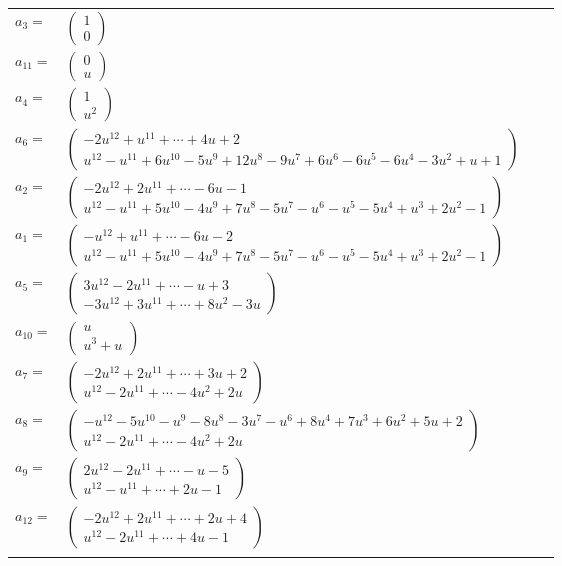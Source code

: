 \documentclass[1p]{elsarticle_modified}
\theoremstyle{definition}
\begin{document}
\begin{tabular}{m{7pt} m{180pt} m{7pt} m{180pt} }
\flushright $a_{3}=$&$\begin{pmatrix}1\\0\end{pmatrix}$ \\
\flushright $a_{11}=$&$\begin{pmatrix}0\\u\end{pmatrix}$ \\
\flushright $a_{4}=$&$\begin{pmatrix}1\\u^2\end{pmatrix}$ \\
\flushright $a_{6}=$&$\begin{pmatrix}-2 u^{12}+u^{11}+\cdots+4 u+2\\u^{12}- u^{11}+6 u^{10}-5 u^9+12 u^8-9 u^7+6 u^6-6 u^5-6 u^4-3 u^2+u+1\end{pmatrix}$ \\
\flushright $a_{2}=$&$\begin{pmatrix}-2 u^{12}+2 u^{11}+\cdots-6 u-1\\u^{12}- u^{11}+5 u^{10}-4 u^9+7 u^8-5 u^7- u^6- u^5-5 u^4+u^3+2 u^2-1\end{pmatrix}$ \\
\flushright $a_{1}=$&$\begin{pmatrix}- u^{12}+u^{11}+\cdots-6 u-2\\u^{12}- u^{11}+5 u^{10}-4 u^9+7 u^8-5 u^7- u^6- u^5-5 u^4+u^3+2 u^2-1\end{pmatrix}$ \\
\flushright $a_{5}=$&$\begin{pmatrix}3 u^{12}-2 u^{11}+\cdots- u+3\\-3 u^{12}+3 u^{11}+\cdots+8 u^2-3 u\end{pmatrix}$ \\
\flushright $a_{10}=$&$\begin{pmatrix}u\\u^3+u\end{pmatrix}$ \\
\flushright $a_{7}=$&$\begin{pmatrix}-2 u^{12}+2 u^{11}+\cdots+3 u+2\\u^{12}-2 u^{11}+\cdots-4 u^2+2 u\end{pmatrix}$ \\
\flushright $a_{8}=$&$\begin{pmatrix}- u^{12}-5 u^{10}- u^9-8 u^8-3 u^7- u^6+8 u^4+7 u^3+6 u^2+5 u+2\\u^{12}-2 u^{11}+\cdots-4 u^2+2 u\end{pmatrix}$ \\
\flushright $a_{9}=$&$\begin{pmatrix}2 u^{12}-2 u^{11}+\cdots- u-5\\u^{12}- u^{11}+\cdots+2 u-1\end{pmatrix}$ \\
\flushright $a_{12}=$&$\begin{pmatrix}-2 u^{12}+2 u^{11}+\cdots+2 u+4\\u^{12}-2 u^{11}+\cdots+4 u-1\end{pmatrix}$\\&\end{tabular}
\end{document}
